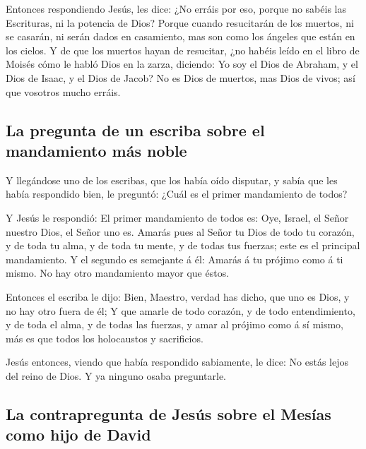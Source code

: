  Entonces respondiendo Jesús, les dice: ¿No erráis por
eso, porque no sabéis las Escrituras, ni la potencia de Dios?
 Porque cuando resucitarán de los muertos, ni se casarán,
ni serán dados en casamiento, mas son como los ángeles que están en los
cielos.  Y de que los muertos hayan de resucitar, ¿no
habéis leído en el libro de Moisés cómo le habló Dios en la zarza,
diciendo: Yo soy el Dios de Abraham, y el Dios de Isaac, y el Dios de
Jacob?  No es Dios de muertos, mas Dios de vivos; así que
vosotros mucho erráis.

\hypertarget{la-pregunta-de-un-escriba-sobre-el-mandamiento-muxe1s-noble}{%
\subsection{La pregunta de un escriba sobre el mandamiento más
noble}\label{la-pregunta-de-un-escriba-sobre-el-mandamiento-muxe1s-noble}}

 Y llegándose uno de los escribas, que los había oído
disputar, y sabía que les había respondido bien, le preguntó: ¿Cuál es
el primer mandamiento de todos?

 Y Jesús le respondió: El primer mandamiento de todos es:
Oye, Israel, el Señor nuestro Dios, el Señor uno es. 
Amarás pues al Señor tu Dios de todo tu corazón, y de toda tu alma, y de
toda tu mente, y de todas tus fuerzas; este es el principal mandamiento.
 Y el segundo es semejante á él: Amarás á tu prójimo como
á ti mismo. No hay otro mandamiento mayor que éstos.

 Entonces el escriba le dijo: Bien, Maestro, verdad has
dicho, que uno es Dios, y no hay otro fuera de él;  Y que
amarle de todo corazón, y de todo entendimiento, y de toda el alma, y de
todas las fuerzas, y amar al prójimo como á sí mismo, más es que todos
los holocaustos y sacrificios.

 Jesús entonces, viendo que había respondido sabiamente,
le dice: No estás lejos del reino de Dios. Y ya ninguno osaba
preguntarle.

\hypertarget{la-contrapregunta-de-jesuxfas-sobre-el-mesuxedas-como-hijo-de-david}{%
\subsection{La contrapregunta de Jesús sobre el Mesías como hijo de
David}\label{la-contrapregunta-de-jesuxfas-sobre-el-mesuxedas-como-hijo-de-david}}

